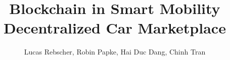 \documentclass{article}
\title{Blockchain in Smart Mobility \\ \large Decentralized Car Marketplace}
\author{Lucas Rebscher, Robin Papke, Hai Duc Dang, Chinh Tran}
\date{}
\begin{document}
\maketitle



\pagebreak
\tableofcontents

\pagebreak
\listoffigures

\pagebreak
\listoftables

\pagebreak


\clearpage

\clearpage

\clearpage

\clearpage

\clearpage

\clearpage



\end{document}
